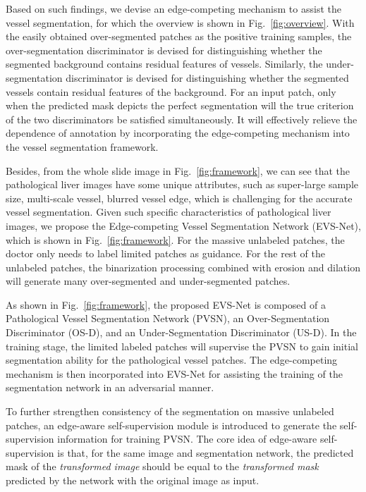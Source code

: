 \documentclass[letterpaper]{article} %
\begin{document}
Based on such findings, we devise an edge-competing mechanism to assist the vessel segmentation, for which
the overview
is shown in Fig.~\ref{fig:overview}.
With the easily obtained over-segmented patches as the positive training samples,
the over-segmentation discriminator is devised for distinguishing whether the segmented background contains  residual features of  vessels.
Similarly, the under-segmentation discriminator is  devised for distinguishing whether the segmented vessels contain  residual features of the background.
For an input patch, only when the predicted mask depicts the perfect segmentation will the true criterion of the two discriminators
be satisfied simultaneously.
It will effectively relieve the dependence of annotation by incorporating the edge-competing mechanism into the vessel segmentation framework.

Besides, from the whole slide image in Fig.~\ref{fig:framework}, we can see that the pathological liver images have some unique attributes, such as super-large sample size, multi-scale vessel, blurred vessel edge,
which is challenging for the accurate vessel segmentation.
Given such specific characteristics of pathological liver images,
we propose the Edge-competing Vessel Segmentation Network (EVS-Net), which is shown in Fig.~\ref{fig:framework}.
For the massive unlabeled patches, the doctor only needs to label limited patches
as guidance.
For the rest of the unlabeled patches, the binarization processing combined with erosion and dilation will generate
many over-segmented and under-segmented patches.

As shown in Fig.~\ref{fig:framework}, the proposed EVS-Net is composed of a Pathological Vessel Segmentation Network (PVSN), an Over-Segmentation Discriminator (OS-D), and an Under-Segmentation Discriminator (US-D).
In the training stage,
the limited labeled  patches will supervise the PVSN to gain initial segmentation ability for the pathological vessel patches.
The edge-competing mechanism is then incorporated into EVS-Net for assisting the training of the segmentation network in an adversarial manner.

To further strengthen  consistency
of the segmentation
on massive unlabeled patches,
an edge-aware self-supervision module is
introduced to generate the self-supervision information for training PVSN.
The core idea of edge-aware self-supervision is that,
for the same image and segmentation network, the predicted mask of the \emph{transformed image} should be equal to the \emph{transformed mask} predicted by the network with the original image as input.
\end{document}
